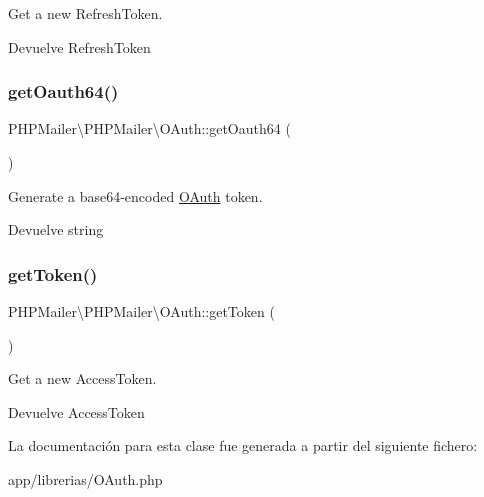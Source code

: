 Get a new Refresh\+Token.

\begin{DoxyReturn}{Devuelve}
Refresh\+Token 
\end{DoxyReturn}
\mbox{\label{classPHPMailer_1_1PHPMailer_1_1OAuth_a4a3f424167a7c1c4eb99068432045d5e}} 
\subsubsection{\texorpdfstring{get\+Oauth64()}{getOauth64()}}
{\footnotesize\ttfamily P\+H\+P\+Mailer\textbackslash{}\+P\+H\+P\+Mailer\textbackslash{}\+O\+Auth\+::get\+Oauth64 (\begin{DoxyParamCaption}{ }\end{DoxyParamCaption})}

Generate a base64-\/encoded \hyperlink{classPHPMailer_1_1PHPMailer_1_1OAuth}{O\+Auth} token.

\begin{DoxyReturn}{Devuelve}
string 
\end{DoxyReturn}
\mbox{\label{classPHPMailer_1_1PHPMailer_1_1OAuth_aca2254505ade7984c55d2fcdc1b2f44a}} 
\subsubsection{\texorpdfstring{get\+Token()}{getToken()}}
{\footnotesize\ttfamily P\+H\+P\+Mailer\textbackslash{}\+P\+H\+P\+Mailer\textbackslash{}\+O\+Auth\+::get\+Token (\begin{DoxyParamCaption}{ }\end{DoxyParamCaption})\hspace{0.3cm}{\ttfamily [protected]}}

Get a new Access\+Token.

\begin{DoxyReturn}{Devuelve}
Access\+Token 
\end{DoxyReturn}


La documentación para esta clase fue generada a partir del siguiente fichero\+:\begin{DoxyCompactItemize}
\item 
app/librerias/O\+Auth.\+php\end{DoxyCompactItemize}
